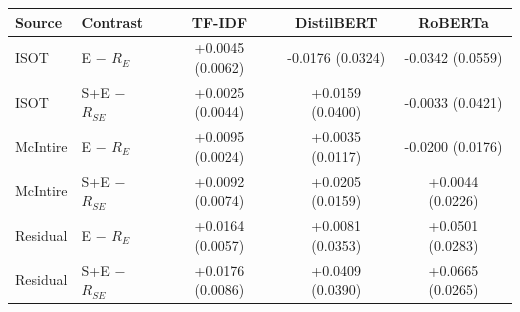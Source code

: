 \begin{tabular}{@{}llccc@{}}
\toprule
Source & Contrast & TF-IDF & DistilBERT & RoBERTa\\
\midrule
ISOT & E $-$ $R_E$ & +0.0045 (0.0062) & -0.0176 (0.0324) & -0.0342 (0.0559)\\
ISOT & S+E $-$ $R_{SE}$ & +0.0025 (0.0044) & +0.0159 (0.0400) & -0.0033 (0.0421)\\
McIntire & E $-$ $R_E$ & +0.0095 (0.0024) & +0.0035 (0.0117) & -0.0200 (0.0176)\\
McIntire & S+E $-$ $R_{SE}$ & +0.0092 (0.0074) & +0.0205 (0.0159) & +0.0044 (0.0226)\\
Residual & E $-$ $R_E$ & +0.0164 (0.0057) & +0.0081 (0.0353) & +0.0501 (0.0283)\\
Residual & S+E $-$ $R_{SE}$ & +0.0176 (0.0086) & +0.0409 (0.0390) & +0.0665 (0.0265)\\
\bottomrule
\end{tabular}
